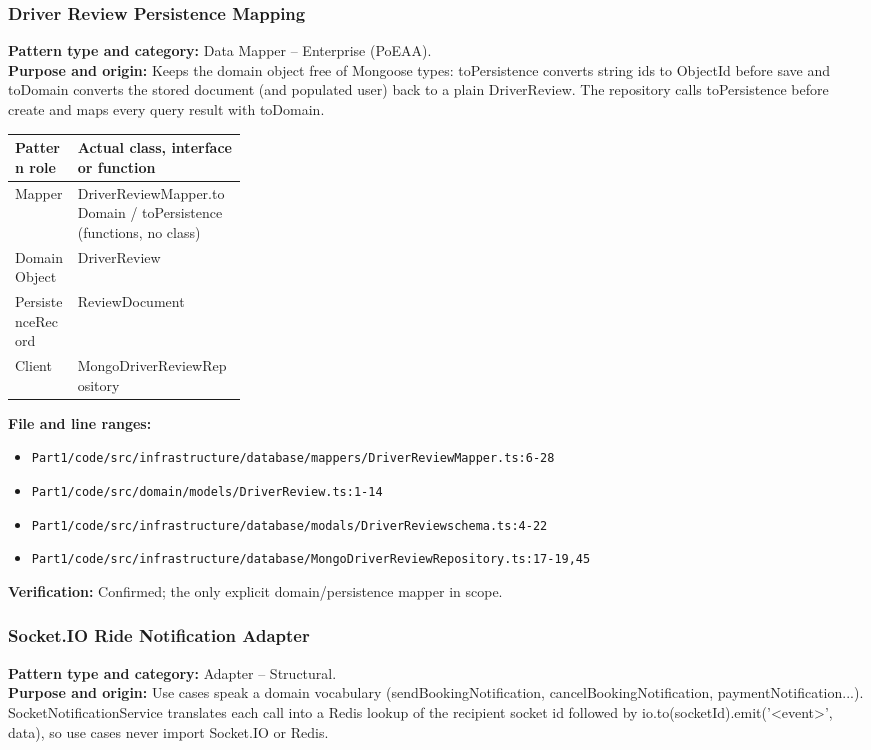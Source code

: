 \documentclass[11pt,a4paper]{article}
\begin{document}
\subsubsection*{Driver Review Persistence Mapping}
\textbf{Pattern type and category:} Data Mapper -- Enterprise (PoEAA).\\
\textbf{Purpose and origin:} Keeps the domain object free of Mongoose types: toPersistence converts string ids to ObjectId before save and toDomain converts the stored document (and populated user) back to a plain DriverReview. The repository calls toPersistence before create and maps every query result with toDomain.

\noindent\begin{tabularx}{\linewidth}{@{}P{0.27\linewidth}Y@{}}
\toprule Pattern role & Actual class, interface or function \\ \midrule
Mapper & DriverReviewMapper.toDomain / toPersistence (functions, no class) \\
DomainObject & DriverReview \\
PersistenceRecord & ReviewDocument \\
Client & MongoDriverReviewRepository \\
\bottomrule
\end{tabularx}

\noindent\textbf{File and line ranges:}\begin{itemize}\setlength\itemsep{0pt}\item \texttt{Part1/\allowbreak{}code/\allowbreak{}src/\allowbreak{}infrastructure/\allowbreak{}database/\allowbreak{}mappers/\allowbreak{}DriverReviewMapper.\allowbreak{}ts:6-28}\item \texttt{Part1/\allowbreak{}code/\allowbreak{}src/\allowbreak{}domain/\allowbreak{}models/\allowbreak{}DriverReview.\allowbreak{}ts:1-14}\item \texttt{Part1/\allowbreak{}code/\allowbreak{}src/\allowbreak{}infrastructure/\allowbreak{}database/\allowbreak{}modals/\allowbreak{}DriverReviewschema.\allowbreak{}ts:4-22}\item \texttt{Part1/\allowbreak{}code/\allowbreak{}src/\allowbreak{}infrastructure/\allowbreak{}database/\allowbreak{}MongoDriverReviewRepository.\allowbreak{}ts:17-19,45}\end{itemize}
\noindent\textbf{Verification:} Confirmed; the only explicit domain/persistence mapper in scope.

\subsubsection*{Socket.IO Ride Notification Adapter}
\textbf{Pattern type and category:} Adapter -- Structural.\\
\textbf{Purpose and origin:} Use cases speak a domain vocabulary (sendBookingNotification, cancelBookingNotification, paymentNotification...). SocketNotificationService translates each call into a Redis lookup of the recipient socket id followed by io.to(socketId).emit('\textless{}event\textgreater{}', data), so use cases never import Socket.IO or Redis.
\end{document}
